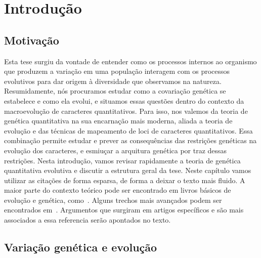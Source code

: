 \cleardoublepage

\pagestyle{fancy}


\chapter{Introdução}\label{intro}


\section{Motivação}\label{intro:historico}

\begin{refsection}

Esta tese surgiu da vontade de entender como os processos internos ao
organismo que produzem a variação em uma população interagem com os processos
evolutivos para dar origem à diversidade que observamos na natureza.
Resumidamente, nós procuramos estudar como a covariação genética se estabelece
e como ela evolui, e situamos essas questões dentro do contexto da
macroevolução de caracteres quantitativos. Para isso, nos valemos da teoria de
genética quantitativa na sua encarnação mais moderna, aliada a teoria de
evolução e das técnicas de mapeamento de loci de caracteres quantitativos.
Essa combinação permite estudar e prever as consequências das restrições
genéticas na evolução dos caracteres, e esmiuçar a arquitura genética por traz
dessas restrições. Nesta introdução, vamos revisar rapidamente a teoria de
genética quantitativa evolutiva e discutir a estrutura geral da tese. Neste
capítulo vamos utilizar as citações de forma esparsa, de forma a deixar o texto mais
fluido. A maior parte do contexto teórico pode ser encontrado em livros
básicos de evolução e genética, como~\textcite{Falconer1996-ot,
Lynch1998-ql, Barton2007-hq}. Alguns trechos mais avançados podem ser
encontrados em~\textcite{Rice2004-jf, Buerger2000-ez}. Argumentos que surgiram
em artigos específicos e são mais associados a essa referencia serão
apontados no texto.

\section{Variação genética e evolução} 


\end{refsection}
